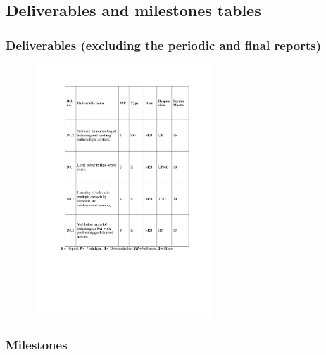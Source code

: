 \documentclass[12pt,a4paper,twoside]{article}
\begin{document}
\subsection{Deliverables and milestones tables}

\subsubsection{Deliverables (excluding the periodic and final reports)}

\begin{figure}
\centering
\includegraphics[width=0.6\textwidth]{./images/deliverables.pdf}
\end{figure}

\subsubsection{Milestones}
\end{document}
